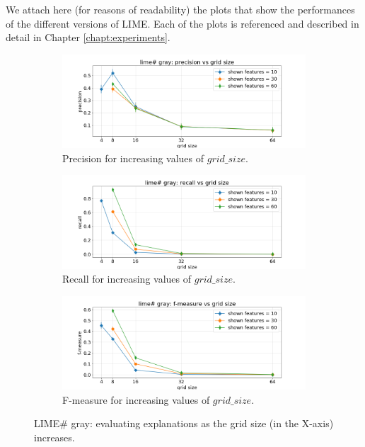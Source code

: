 \documentclass[12pt, twoside, a4paper]{report}
\begin{document}
We attach here (for reasons of readability) the plots that show the performances of the different versions of LIME. Each of the plots is referenced and described in detail in Chapter \ref{chapt:experiments}.


\begin{figure}[h]
\centering
\begin{subfigure}[b]{\linewidth}
\includegraphics[width=\linewidth]{images/figs/VSGRID/limesharp gray/limesharp gray: precision vs grid size.png} 
\caption{Precision for increasing values of $grid\_size$.}
\label{subfig:limesharp_gray_prec_vs_gs}
\end{subfigure}
\begin{subfigure}[b]{\linewidth}
\includegraphics[width=\linewidth]{images/figs/VSGRID/limesharp gray/limesharp gray: recall vs grid size.png} 
\caption{Recall for increasing values of $grid\_size$.}
\label{subfig:limesharp_gray_rec_vs_gs}
\end{subfigure}
\begin{subfigure}[b]{\linewidth}
\includegraphics[width=\linewidth]{images/figs/VSGRID/limesharp gray/limesharp gray: f-measure vs grid size.png} 
\caption{F-measure for increasing values of $grid\_size$.}
\label{subfig:limesharp_gray_fmea_vs_gs}
\end{subfigure}
\caption{LIME\# gray: evaluating explanations as the grid size (in the X-axis) increases.}
\label{fig:limesharp_gray_vs_gs}
\end{figure}
\end{document}
